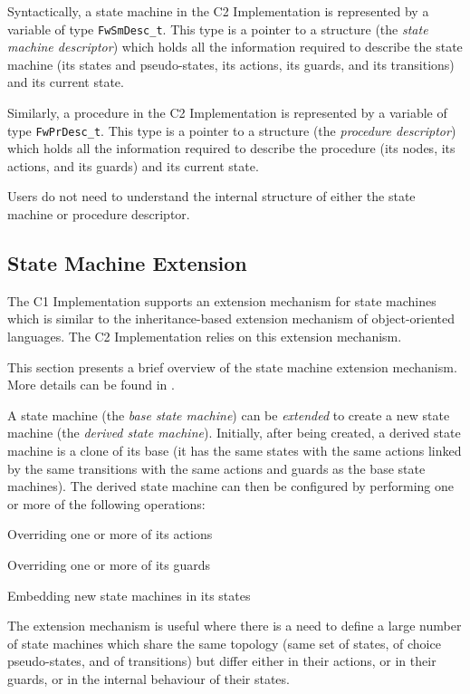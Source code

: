 \documentclass[a4paper,10pt]{article}
\newenvironment{fw_itemize}						%
{\begin{itemize}
  \setlength{\itemsep}{1mm}
  \setlength{\parskip}{0pt}
  \setlength{\parsep}{0pt}}
{\end{itemize}}
\begin{document}
Syntactically, a state machine in the C2 Implementation is represented by a variable of type \texttt{FwSmDesc\_t}. This type is a pointer to a structure (the \textit{state machine descriptor}) which holds all the information required to describe the state machine (its states and pseudo-states, its actions, its guards, and its transitions) and its current state. 

Similarly, a procedure in the C2 Implementation is represented by a variable of type \texttt{FwPrDesc\_t}. This type is a pointer to a structure (the \textit{procedure descriptor}) which holds all the information required to describe the procedure (its nodes, its actions, and its guards) and its current state. 

Users do not need to understand the internal structure of either the state machine or procedure descriptor.

\subsection{State Machine Extension}\label{sec:SmExtension} 
The C1 Implementation supports an extension mechanism for state machines which is similar to the inheritance-based extension mechanism of object-oriented languages. The C2 Implementation relies on this extension mechanism.

This section presents a brief overview of the state machine extension mechanism. More details can be found in \cite{ref:C1Implementation}. 

A state machine (the \emph{base state machine}) can be \emph{extended} to create a new state machine (the \emph{derived state machine}). Initially, after being created, a derived state machine is a clone of its base (it has the same states with the same actions linked by the same transitions with the same actions and guards as the base state machines). The derived state machine can then be configured by performing one or more of the following operations: 

\begin{fw_itemize}
\item Overriding one or more of its actions 
\item Overriding one or more of its guards 
\item Embedding new state machines in its states
\end{fw_itemize}

The extension mechanism is useful where there is a need to define a large number of state machines which share the same topology (same set of states, of choice pseudo-states, and of transitions) but differ either in their actions, or in their guards, or in the internal behaviour of their states.
\end{document}
